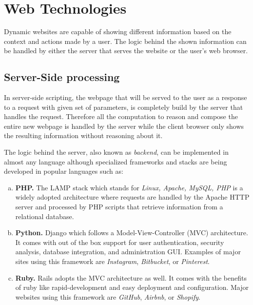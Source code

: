 \section{Web Technologies}
Dynamic websites are capable of showing different information based on the context and actions made by a user. The logic behind the shown information can be handled by either the server that serves the website or the user's web browser. 

\subsection{Server-Side processing}

In server-side scripting, the webpage that will be served to the user as a response to a request with given set of parameters, is completely build by the server that handles the request. Therefore all the computation to reason and compose the entire new webpage is handled by the server while the client browser only shows the resulting information without reasoning about it.

The logic behind the server, also known as \textit{backend}, can be implemented in almost any language although specialized frameworks and stacks are being developed in popular languages such as:

\begin{enumerate}[a)]
	\item \textbf{PHP.} The LAMP stack \cite{lamp} which stands for \textit{Linux, Apache, MySQL, PHP} is a widely adopted architecture where requests are handled by the Apache HTTP server and processed by PHP scripts that retrieve information from a relational database.

	\item \textbf{Python.} Django \cite{django} which follows a Model-View-Controller (MVC) architecture. It comes with out of the box support for user authentication, security analysis, database integration, and administration GUI. Examples of major sites using this framework are \textit{Instagram}, \textit{Bitbucket}, or \textit{Pinterest}. \cite{django-websites}
	
	\item \textbf{Ruby.} Rails adopts the MVC architecture as well. It comes with the benefits of ruby like rapid-development and easy deployment and configuration. Major websites using this framework are \textit{GitHub}, \textit{Airbnb}, or \textit{Shopify}. \cite{rails}
\end{enumerate}

